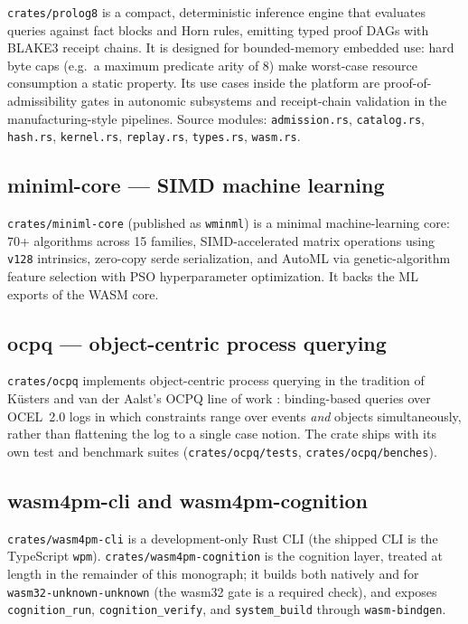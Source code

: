 \documentclass[11pt,oneside]{report}
\newcommand{\wpm}{\texttt{wpm}}
\begin{document}
\texttt{crates/prolog8} is a compact, deterministic inference engine that
evaluates queries against fact blocks and Horn rules, emitting typed proof
DAGs with BLAKE3 receipt chains. It is designed for bounded-memory embedded
use: hard byte caps (e.g.\ a maximum predicate arity of 8) make worst-case
resource consumption a static property. Its use cases inside the platform
are proof-of-admissibility gates in autonomic subsystems and receipt-chain
validation in the manufacturing-style pipelines. Source modules:
\texttt{admission.rs}, \texttt{catalog.rs}, \texttt{hash.rs},
\texttt{kernel.rs}, \texttt{replay.rs}, \texttt{types.rs}, \texttt{wasm.rs}.

\subsection{miniml-core --- SIMD machine learning}

\texttt{crates/miniml-core} (published as \texttt{wminml}) is a minimal
machine-learning core: 70+ algorithms across 15 families, SIMD-accelerated
matrix operations using \texttt{v128} intrinsics, zero-copy serde
serialization, and AutoML via genetic-algorithm feature selection with PSO
hyperparameter optimization. It backs the ML exports of the WASM core.

\subsection{ocpq --- object-centric process querying}

\texttt{crates/ocpq} implements object-centric process querying in the
tradition of K\"usters and van der Aalst's OCPQ line of work
\cite{ocpq}: binding-based queries over OCEL~2.0 logs in which constraints
range over events \emph{and} objects simultaneously, rather than flattening
the log to a single case notion. The crate ships with its own test and
benchmark suites (\texttt{crates/ocpq/tests}, \texttt{crates/ocpq/benches}).

\subsection{wasm4pm-cli and wasm4pm-cognition}

\texttt{crates/wasm4pm-cli} is a development-only Rust CLI (the shipped CLI
is the TypeScript \wpm{}). \texttt{crates/wasm4pm-cognition} is the
cognition layer, treated at length in the remainder of this monograph; it
builds both natively and for \texttt{wasm32-unknown-unknown} (the wasm32
gate is a required check), and exposes \texttt{cognition\_run},
\texttt{cognition\_verify}, and \texttt{system\_build} through
\texttt{wasm-bindgen}.
\end{document}
